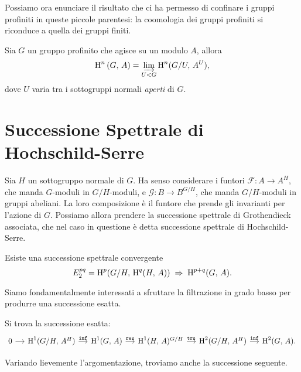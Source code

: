 \begin{profinite}
Possiamo ora enunciare il risultato che ci ha permesso di confinare i gruppi profiniti in queste piccole parentesi: la coomologia dei gruppi profiniti si riconduce a quella dei gruppi finiti.

\begin{proposition}\label{limite}
	Sia $ G $ un gruppo profinito che agisce su un modulo $ A $, allora
	\[ \operatorname{H}^n \left(G, \, A \right)  = \varinjlim_{U < G} \operatorname{H}^n(G/U, \, A^U), \]
	dove $ U $ varia tra i sottogruppi normali \emph{aperti} di $ G $.
\end{proposition}
\end{profinite}


\section{Successione Spettrale di Hochschild-Serre}

Sia $ H $ un sottogruppo normale di $ G $. Ha senso considerare i funtori $ \mathcal{F}\colon A \to A^H $, che manda $ G $-moduli in $ G/H $-moduli, e $ \mathcal{G}\colon B \to B^{G/H} $, che manda $ G/H $-moduli in gruppi abeliani. La loro composizione è il funtore che prende gli invarianti per l'azione di $ G $. Possiamo allora prendere la successione spettrale di Grothendieck associata, che nel caso in questione è detta successione spettrale di Hochschild-Serre.

\begin{theorem}
	Esiste una successione spettrale convergente
	\[ E^{pq}_2 = \operatorname{H}^p(G/H, \, \operatorname{H}^q(H, \, A)) \;\Rightarrow\; \operatorname{H}^{p+q}(G, \, A). \]
\end{theorem}

Siamo fondamentalmente interessati a sfruttare la filtrazione in grado basso per produrre una successione esatta. 

\begin{corollary}\label{boo1}
	Si trova la successione esatta:
	\[\begin{tikzcd}[column sep = small]
	0 \rar & \HH^1(G/H, \, A^H) \rar["\Inf"]
	& \HH^1(G, \, A) \rar["\Res"]
	& \HH^1(H, \, A)^{G/H} \rar["\mathtt{trs}"]
	& \HH^2(G/H, \, A^H) \rar["\Inf"]
	& \HH^2(G, \, A).
	\end{tikzcd} \]
\end{corollary}

Variando lievemente l'argomentazione, troviamo anche la successione seguente.

